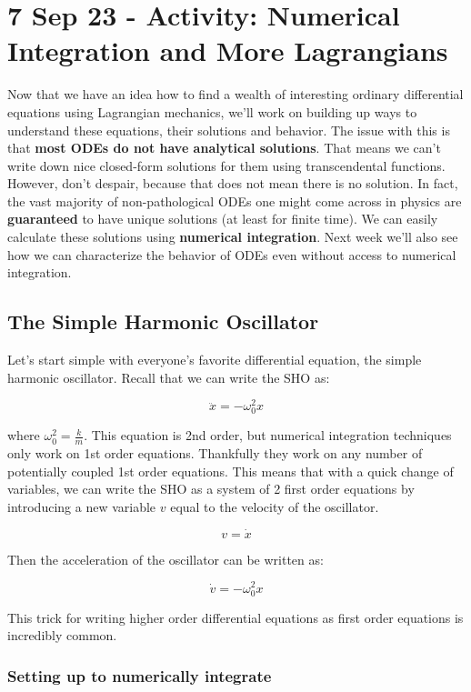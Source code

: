 \section{7 Sep 23 - Activity: Numerical Integration and More
Lagrangians}\label{sep-23---activity-numerical-integration-and-more-lagrangians}

Now that we have an idea how to find a wealth of interesting ordinary
differential equations using Lagrangian mechanics, we'll work on
building up ways to understand these equations, their solutions and
behavior. The issue with this is that \textbf{most ODEs do not have
analytical solutions}. That means we can't write down nice closed-form
solutions for them using transcendental functions. However, don't
despair, because that does not mean there is no solution. In fact, the
vast majority of non-pathological ODEs one might come across in physics
are \textbf{guaranteed} to have unique solutions (at least for finite
time). We can easily calculate these solutions using \textbf{numerical
integration}. Next week we'll also see how we can characterize the
behavior of ODEs even without access to numerical integration.

\subsection{The Simple Harmonic
Oscillator}\label{the-simple-harmonic-oscillator}

Let's start simple with everyone's favorite differential equation, the
simple harmonic oscillator. Recall that we can write the SHO as:

\[
\ddot{x} =  -\omega_0^2x
\]

where \(\omega_0^2 = \frac{k}{m}\). This equation is 2nd order, but
numerical integration techniques only work on 1st order equations.
Thankfully they work on any number of potentially coupled 1st order
equations. This means that with a quick change of variables, we can
write the SHO as a system of 2 first order equations by introducing a
new variable \(v\) equal to the velocity of the oscillator.

\[
v = \dot{x}
\]

Then the acceleration of the oscillator can be written as:

\[
\dot{v}  = -\omega_0^2x
\]

This trick for writing higher order differential equations as first
order equations is incredibly common.

\subsubsection{Setting up to numerically
integrate}\label{setting-up-to-numerically-integrate}

